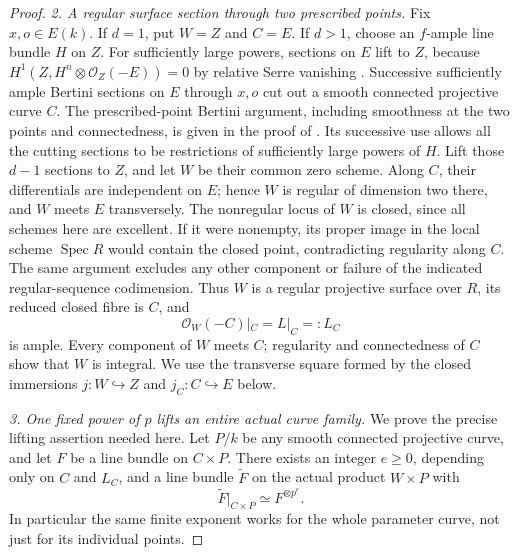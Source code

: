 \begin{proof}
\emph{2. A regular surface section through two prescribed points.}
Fix $x,o\in E(k)$. If $d=1$, put $W=Z$ and $C=E$.
If $d>1$, choose an $f$-ample line bundle $H$ on $Z$. For sufficiently
large powers, sections on $E$ lift to $Z$, because
$H^1(Z,H^n\otimes\mathcal O_Z(-E))=0$ by relative Serre vanishing
\citep[Lemma 30.17.1]{frC3azStacksSerre}.
Successive sufficiently ample Bertini sections on $E$ through $x,o$
cut out a smooth connected projective curve $C$. The prescribed-point
Bertini argument, including smoothness at the two points and
connectedness, is given in the proof of
\citet[Lemma 45.8.3]{frC3azStacksBertini}. Its successive use allows
all the cutting sections to be restrictions of sufficiently large
powers of $H$.
Lift those $d-1$ sections to $Z$, and let $W$ be their common zero
scheme. Along $C$, their differentials are independent on $E$;
hence $W$ is regular of dimension two there, and $W$ meets $E$
transversely. The nonregular locus of $W$ is closed, since all
schemes here are excellent. If it were nonempty, its proper image
in the local scheme $\operatorname{Spec}R$ would contain the closed
point, contradicting regularity along $C$. The same argument excludes
any other component or failure of the indicated regular-sequence
codimension. Thus $W$ is a regular projective surface over $R$,
its reduced closed fibre is $C$, and
\[
                   \mathcal O_W(-C)|_C=L|_C=:L_C
\]
is ample. Every component of $W$ meets $C$; regularity and connectedness
of $C$ show that $W$ is integral. We use the transverse square
formed by the closed immersions $j:W\hookrightarrow Z$ and
$j_C:C\hookrightarrow E$ below.

\emph{3. One fixed power of $p$ lifts an entire actual curve family.}
We prove the precise lifting assertion needed here. Let $P/k$ be
any smooth connected projective curve, and let $F$ be a line bundle
on $C\times P$. There exists an integer $e\ge0$, depending only on
$C$ and $L_C$, and a line bundle $\widetilde F$ on the actual product
$W\times P$ with
\begin{equation}\label{eq:C3az-family-lift}
                \widetilde F|_{C\times P}\simeq F^{\otimes p^e}.
\end{equation}
In particular the same finite exponent works for the whole parameter
curve, not just for its individual points.


\end{proof}
